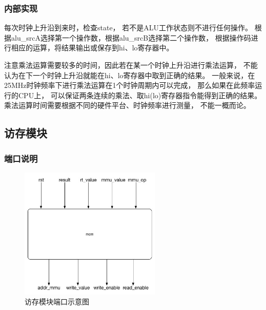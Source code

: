         \subsubsection{内部实现}
            每次时钟上升沿到来时，检查state，%
            若不是ALU工作状态则不进行任何操作。%
            根据alu\_srcA选择第一个操作数，根据alu\_srcB选择第二个操作数，%
            根据操作码进行相应的运算，将结果输出或保存到hi、lo寄存器中。

            注意乘法运算需要较多的时间，因此若在某一个时钟上升沿进行乘法运算，%
            不能认为在下一个时钟上升沿就能在hi、lo寄存器中取到正确的结果。%
            一般来说，在25MHz时钟频率下进行乘法运算在1个时钟周期内可以完成，%
            那么如果在此频率运行的CPU上，%
            可以保证两条连续的乘法、取hi(lo)寄存器指令能得到正确的结果。%
            乘法运算时间需要根据不同的硬件平台、时钟频率进行测量，%
            不能一概而论。
    \subsection{访存模块}
        \subsubsection{端口说明}
            
            \begin{figure}[!hbp]
                \centering
                \caption{访存模块端口示意图}
                \includegraphics[width=0.6\textwidth]{chart/mem.jpg}
            \end{figure}

